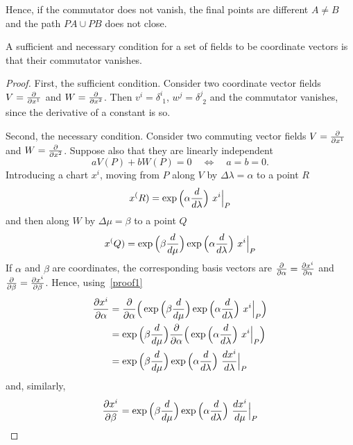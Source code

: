     Hence, if the commutator does not vanish, the final points are different $A \neq B$ and the path $PA \cup PB$ does not close. 

    A sufficient and necessary condition for a set of fields to be coordinate vectors is that their commutator vanishes. 
    \begin{proof}
    First, the sufficient condition. Consider two coordinate vector fields $V = \frac{\partial}{\partial x^1}$ and $W = \frac{\partial}{\partial x^2}$. Then $v^i = \delta^i_{\phantom i 1}$, $w^j = \delta^j_{\phantom j 2}$ and the commutator vanishes, since the derivative of a constant is so. 

    Second, the necessary condition. Consider two commuting vector fields $V = \frac{\partial}{\partial x^1}$ and $W = \frac{\partial}{\partial x^2}$. Suppose also that they are linearly independent
    \begin{equation} \label{proof2}
        a V(P) + b W(P) = 0 \quad \iff \quad a = b = 0.
    \end{equation}
    Introducing a chart $x^i$, moving from $P$ along $V$ by $\Delta \lambda = \alpha$ to a point $R$
    \begin{equation*}
        x^(R) = \exp \Big (\alpha \frac{d}{d\lambda} \Big) ~ x^i \Big\vert_P
    \end{equation*}
    and then along $W$ by $\Delta \mu = \beta$ to a point $Q$
    \begin{equation}\label{proof1}
        x^(Q) = \exp \Big (\beta \frac{d}{d\mu} \Big) \exp \Big (\alpha \frac{d}{d\lambda} \Big) ~ x^i \Big\vert_P
    \end{equation}
    If $\alpha$ and $\beta$ are coordinates, the corresponding basis vectors are $\frac{\partial}{\partial\alpha} = \frac{\partial x^i}{\partial\alpha}$ and $\frac{\partial}{\partial\beta} = \frac{\partial x^i}{\partial\beta}$.
    Hence, using~\eqref{proof1}
    \begin{equation*}
    \begin{aligned}
        \frac{\partial x^i}{\partial\alpha} & = \frac{\partial}{\partial\alpha} \Big ( \exp \Big( \beta \frac{d}{d\mu} \Big) \exp \Big( \alpha \frac{d}{d\lambda} \Big) ~ x^i \Big\vert_P \Big) \\ & = \exp \Big( \beta \frac{d}{d\mu} \Big) \frac{\partial}{\partial\alpha} \Big ( \exp \Big( \alpha \frac{d}{d\lambda} \Big) ~ x^i \Big\vert_P \Big) \\ & = \exp \Big( \beta \frac{d}{d\mu} \Big) \exp \Big( \alpha \frac{d}{d\lambda} \Big) ~ \frac{dx^i}{d\lambda} \Big\vert_P
    \end{aligned}
    \end{equation*}
    and, similarly, 
    \begin{equation*}
        \pdv{x^i}{\beta} = \exp \Big( \beta \dv{}{\mu} \Big) \exp \Big( \alpha \dv{}{\lambda} \Big) ~ \dv{x^i}{\mu} \Big\vert_P

\end{equation*}
\end{proof}
